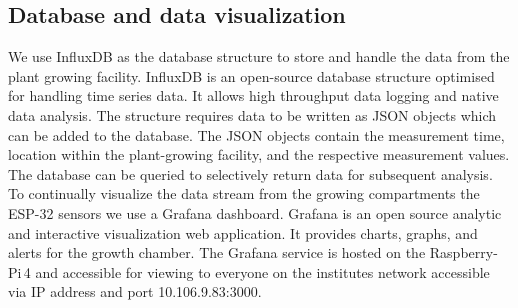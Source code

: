 \documentclass[reprint,superscriptaddress,aps,amsmath,amssymb]{revtex4-1}
\begin{document}
\subsection{Database and data visualization}
We use InfluxDB as the database structure to store and handle the data from the plant growing facility. InfluxDB is an open-source database structure optimised for handling time series data. It allows high throughput data logging and native data analysis. The structure requires data to be written as JSON objects which can be added to the database. The JSON objects contain the measurement time, location within the plant-growing facility, and the respective measurement values. The database can be queried to selectively return data for subsequent analysis. To continually visualize the data stream from the growing compartments  the ESP-32 sensors we use a Grafana dashboard. Grafana is an open source analytic and interactive visualization web application. It provides charts, graphs, and alerts for the growth chamber. The Grafana service is hosted on the Raspberry-Pi\,4 and accessible for viewing to everyone on the institutes network accessible via IP address and port 10.106.9.83:3000.
\end{document}
